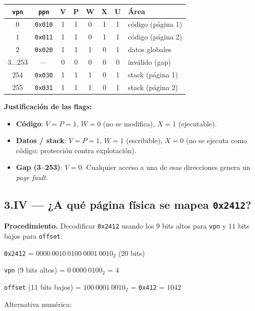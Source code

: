 \documentclass[11pt,a4paper]{article}
\begin{document}
\begin{center}
\small
\begin{tabular}{@{}cccccccl@{}}
\toprule
\texttt{vpn} & \texttt{ppn} & V & P & W & X & U & Área \\
\midrule
$0$     & \texttt{0x010} & 1 & 1 & 0 & 1 & 1 & código (página 1) \\
$1$     & \texttt{0x011} & 1 & 1 & 0 & 1 & 1 & código (página 2) \\
$2$     & \texttt{0x020} & 1 & 1 & 1 & 0 & 1 & datos globales \\
$3 \ldots 253$ & ---       & 0 & 0 & 0 & 0 & 0 & inválido (gap) \\
$254$   & \texttt{0x030} & 1 & 1 & 1 & 0 & 1 & stack (página 1) \\
$255$   & \texttt{0x031} & 1 & 1 & 1 & 0 & 1 & stack (página 2) \\
\bottomrule
\end{tabular}
\end{center}

\textbf{Justificación de las flags:}

\begin{itemize}[leftmargin=*,nosep]
    \item \textbf{Código}: $V=P=1$, $W=0$ (no se modifica),
        $X=1$ (ejecutable).
    \item \textbf{Datos / stack}: $V=P=1$, $W=1$ (escribible),
        $X=0$ (no se ejecuta como código; protección contra
        explotación).
    \item \textbf{Gap (3--253)}: $V=0$. Cualquier acceso a una de
        esas direcciones genera un \emph{page fault}.
\end{itemize}

\subsection*{3.IV --- ¿A qué página física se mapea \texttt{0x2412}?}

\textbf{Procedimiento.} Decodificar \texttt{0x2412} usando los $9$
bits altos para \texttt{vpn} y $11$ bits bajos para \texttt{offset}.

\quad \texttt{0x2412} = $0000\ 0010\ 0100\ 0001\ 0010_2$ (20 bits)

\quad \texttt{vpn} (9 bits altos) = $0\ 0000\ 0100_2$ = $4$

\quad \texttt{offset} (11 bits bajos) = $100\ 0001\ 0010_2$ = \texttt{0x412} = $1042$

Alternativa numérica:
\end{document}
